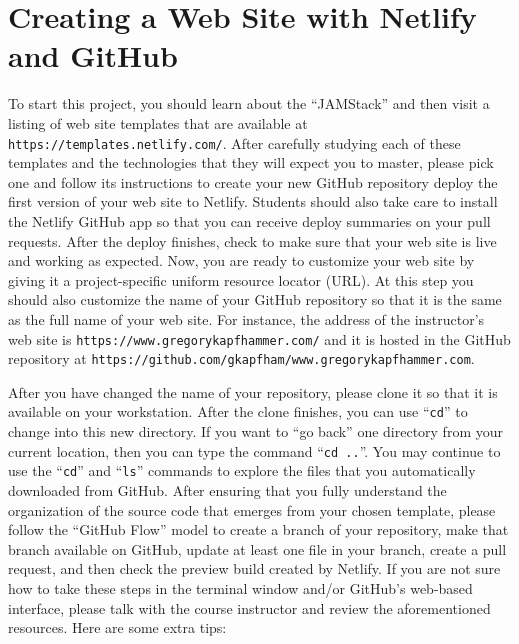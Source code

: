\documentclass[11pt]{article}
\newcommand{\command}[1]{``\lstinline{#1}''}
\newcommand{\program}[1]{\lstinline{#1}}
\newcommand{\url}[1]{\lstinline{#1}}
\newcommand{\step}[1]{``{#1}''}
\begin{document}
\section*{Creating a Web Site with Netlify and GitHub}

To start this project, you should learn about the ``JAMStack'' and then visit a
listing of web site templates that are available at
\url{https://templates.netlify.com/}. After carefully studying each of these
templates and the technologies that they will expect you to master, please pick
one and follow its instructions to create your new GitHub repository deploy the
first version of your web site to Netlify.
%
Students should also take care to install the Netlify GitHub app so that you can
receive deploy summaries on your pull requests.
%
After the deploy finishes, check to make sure that your web site is live and
working as expected.
%
Now, you are ready to customize your web site by giving it a project-specific
uniform resource locator (URL). At this step you should also customize the name
of your GitHub repository so that it is the same as the full name of your web
site. For instance, the address of the instructor's web site is
\url{https://www.gregorykapfhammer.com/} and it is hosted in the GitHub
repository at \url{https://github.com/gkapfham/www.gregorykapfhammer.com}.

After you have changed the name of your repository, please clone it so that it
is available on your workstation.
%
After the clone finishes, you can use \command{cd} to change into this new
directory. If you want to \step{go back} one directory from your current
location, then you can type the command \command{cd ..}. You may continue to use
the \command{cd} and \command{ls} commands to explore the files that you
automatically downloaded from GitHub.
%
After ensuring that you fully understand the organization of the source code
that emerges from your chosen template, please follow the ``GitHub Flow'' model
to create a branch of your repository, make that branch available on GitHub,
update at least one file in your branch, create a pull request, and then check
the preview build created by Netlify.
%
If you are not sure how to take these steps in the terminal window and/or
GitHub's web-based interface, please talk with the course instructor and review
the aforementioned resources. Here are some extra tips:

\end{document}
